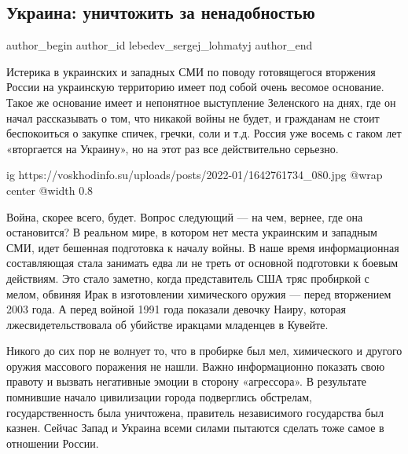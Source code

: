  
 
 
 
 
 
\subsection{Украина: уничтожить за ненадобностью}
\label{sec:21_01_2022.stz.news.nvr.voshod_info.1.ukraina_unichtozhit_za_nenadobnostju}
 
\ifcmt
 author_begin
   author_id lebedev_sergej_lohmatyj
 author_end
\fi

Истерика в украинских и западных СМИ по поводу готовящегося вторжения России на
украинскую территорию имеет под собой очень весомое основание.  Такое же
основание имеет и непонятное выступление Зеленского на днях, где он начал
рассказывать о том, что никакой войны не будет, и гражданам не стоит
беспокоиться о закупке спичек, гречки, соли и т.д. Россия уже восемь с гаком
лет «вторгается на Украину», но на этот раз все действительно серьезно.

\ifcmt
  ig https://voskhodinfo.su/uploads/posts/2022-01/1642761734_080.jpg
	@wrap center
	@width 0.8
\fi

Война, скорее всего, будет. Вопрос следующий — на чем, вернее, где она
остановится? В реальном мире, в котором нет места украинским и западным СМИ,
идет бешенная подготовка к началу войны. В наше время информационная
составляющая стала занимать едва ли не треть от основной подготовки к боевым
действиям. Это стало заметно, когда представитель США тряс пробиркой с мелом,
обвиняя Ирак в изготовлении химического оружия — перед вторжением 2003 года. А
перед войной 1991 года показали девочку Наиру, которая лжесвидетельствовала об
убийстве иракцами младенцев в Кувейте.

Никого до сих пор не волнует то, что в пробирке был мел, химического и другого
оружия массового поражения не нашли. Важно информационно показать свою правоту
и вызвать негативные эмоции в сторону «агрессора». В результате помнившие
начало цивилизации города подверглись обстрелам, государственность была
уничтожена, правитель независимого государства был казнен. Сейчас Запад и
Украина всеми силами пытаются сделать тоже самое в отношении России.

